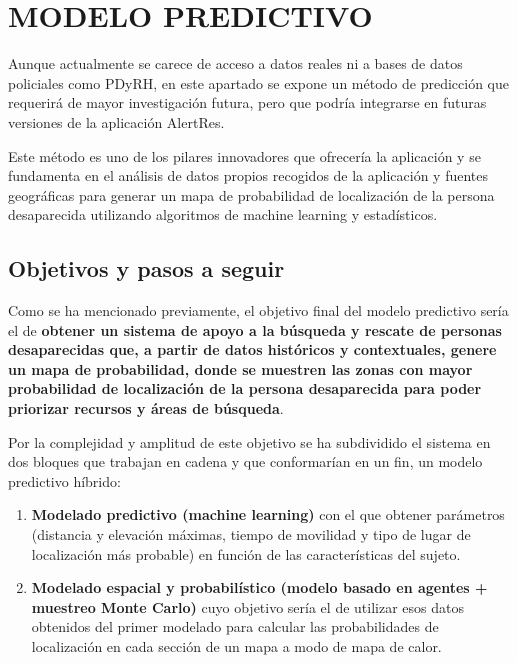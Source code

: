 \chapter{MODELO PREDICTIVO}\label{Resultados_pred}

Aunque actualmente se carece de acceso a datos reales ni a bases de datos policiales como PDyRH, en este apartado se expone un método de predicción que requerirá de mayor investigación futura, pero que podría integrarse en futuras versiones de la aplicación AlertRes. 

Este método es uno de los pilares innovadores que ofrecería la aplicación y se fundamenta en el análisis de datos propios recogidos de la aplicación y fuentes geográficas para generar un mapa de probabilidad de localización de la persona desaparecida utilizando algoritmos de machine learning y estadísticos. 


\section{Objetivos y pasos a seguir}

Como se ha mencionado previamente, el objetivo final del modelo predictivo sería el de \textbf{obtener un sistema de apoyo a la búsqueda y rescate de personas desaparecidas que, a partir de datos históricos y contextuales, genere un mapa de probabilidad, donde se muestren las zonas con mayor probabilidad de localización de la persona desaparecida para poder priorizar recursos y áreas de búsqueda}.

Por la complejidad y amplitud de este objetivo se ha subdividido el sistema en dos bloques que trabajan en cadena y que conformarían en un fin, un modelo predictivo híbrido:

\begin{enumerate}
    \item \textbf{Modelado predictivo (machine learning)} con el que obtener parámetros (distancia y elevación máximas, tiempo de movilidad y tipo de lugar de localización más probable) en función de las características del sujeto.
    
    \item \textbf{Modelado espacial y probabilístico (modelo basado en agentes + muestreo Monte Carlo)} cuyo objetivo sería el de utilizar esos datos obtenidos del primer modelado para calcular las probabilidades de localización en cada sección de un mapa a modo de mapa de calor.
\end{enumerate}

